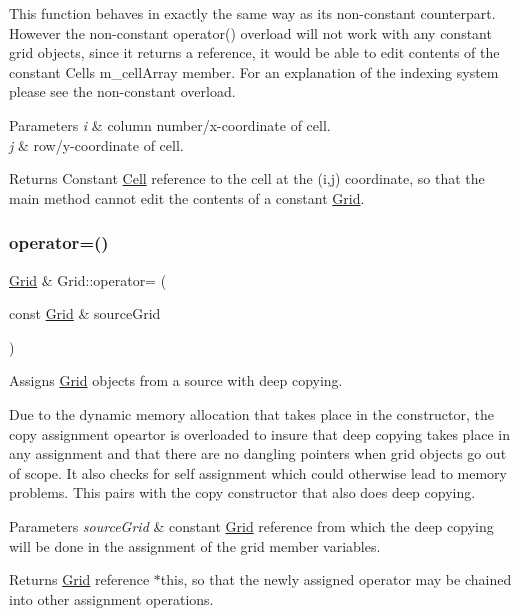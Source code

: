 This function behaves in exactly the same way as its non-\/constant counterpart. However the non-\/constant operator() overload will not work with any constant grid objects, since it returns a reference, it would be able to edit contents of the constant Cells m\+\_\+cell\+Array member. For an explanation of the indexing system please see the non-\/constant overload.


\begin{DoxyParams}{Parameters}
{\em i} & column number/x-\/coordinate of cell. \\
\hline
{\em j} & row/y-\/coordinate of cell.\\
\hline
\end{DoxyParams}
\begin{DoxyReturn}{Returns}
Constant \hyperlink{class_cell}{Cell} reference to the cell at the (i,j) coordinate, so that the main method cannot edit the contents of a constant \hyperlink{class_grid}{Grid}. 
\end{DoxyReturn}
\mbox{\label{class_grid_aae7b118be13f65bf2e3a72881d8a06df}} 
\subsubsection{\texorpdfstring{operator=()}{operator=()}\hspace{0.1cm}{\footnotesize\ttfamily [1/2]}}
{\footnotesize\ttfamily \hyperlink{class_grid}{Grid} \& Grid\+::operator= (\begin{DoxyParamCaption}\item[{const \hyperlink{class_grid}{Grid} \&}]{source\+Grid }\end{DoxyParamCaption})}



Assigns \hyperlink{class_grid}{Grid} objects from a source with deep copying. 

Due to the dynamic memory allocation that takes place in the constructor, the copy assignment opeartor is overloaded to insure that deep copying takes place in any assignment and that there are no dangling pointers when grid objects go out of scope. It also checks for self assignment which could otherwise lead to memory problems. This pairs with the copy constructor that also does deep copying.


\begin{DoxyParams}{Parameters}
{\em source\+Grid} & constant \hyperlink{class_grid}{Grid} reference from which the deep copying will be done in the assignment of the grid member variables.\\
\hline
\end{DoxyParams}
\begin{DoxyReturn}{Returns}
\hyperlink{class_grid}{Grid} reference $\ast$this, so that the newly assigned operator may be chained into other assignment operations. 
\end{DoxyReturn}
\mbox{\label{class_grid_a9f84434eb37abc5cd0979cd609b2a2d8}} 
